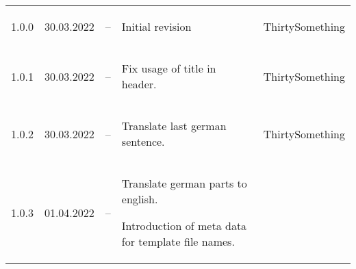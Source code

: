 \begin{tiny}
    \renewcommand*{\arraystretch}{1.5}
    \begin{longtable}{ | p{} | p{} | p{} | P{0.49\textwidth} | p{0.15\textwidth} | }
        \hline
             &
                &
             &
         &
                  \\
        \hline
        1.0.0                    &
        30.03.2022               &
        --                       &
        \begin{tsLTItemize}
            \item Initial revision
        \end{tsLTItemize}
                                 &
        ThirtySomething            \\
        \hline
        1.0.1                    &
        30.03.2022               &
        --                       &
        \begin{tsLTItemize}
            \item Fix usage of title in header.
        \end{tsLTItemize}
                                 &
        ThirtySomething            \\
        \hline
        1.0.2                    &
        30.03.2022               &
        --                       &
        \begin{tsLTItemize}
            \item Translate last german sentence.
        \end{tsLTItemize}
                                 &
        ThirtySomething            \\
        \hline
        1.0.3                    &
        01.04.2022               &
        --                       &
        \begin{tsLTItemize}
            \item Translate german parts to english.
            \item Introduction of meta data for template file names.
        \end{tsLTItemize}

\end{longtable}
\end{tiny}
